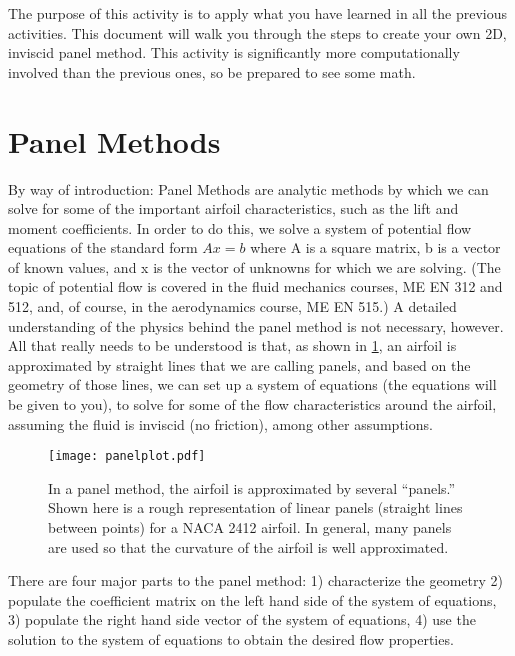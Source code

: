 \documentclass{article}%
\begin{document}
The purpose of this activity is to apply what you have learned in all the previous activities. This document will walk you through the steps to create your own 2D, inviscid panel method. This activity is significantly more computationally involved than the previous ones, so be prepared to see some math.

\section*{Panel Methods}

By way of introduction: Panel Methods are analytic methods by which we can solve for some of the important airfoil characteristics, such as the lift and moment coefficients. In order to do this, we solve a system of potential flow equations of the standard form \(Ax=b\) where A is a square matrix, b is a vector of known values, and x is the vector of unknowns for which we are solving. (The topic of potential flow is covered in the fluid mechanics courses, ME EN 312 and 512, and, of course, in the aerodynamics course, ME EN 515.) A detailed understanding of the physics behind the panel method is not necessary, however. All that really needs to be understood is that, as shown in \cref{fig:panelplot}, an airfoil is approximated by straight lines that we are calling panels, and based on the geometry of those lines, we can set up a system of equations (the equations will be given to you), to solve for some of the flow characteristics around the airfoil, assuming the fluid is inviscid (no friction), among other assumptions.

\begin{figure}[h!]
	\centering
	\texttt{[image: panelplot.pdf]}
	\caption{In a panel method, the airfoil is approximated by several ``panels.'' Shown here is a rough representation of linear panels (straight lines between points) for a NACA 2412 airfoil. In general, many panels are used so that the curvature of the airfoil is well approximated.}
	\label{fig:panelplot}
\end{figure}

There are four major parts to the panel method: 1) characterize the geometry 2) populate the coefficient matrix on the left hand side of the system of equations, 3) populate the right hand side vector of the system of equations, 4) use the solution to the system of equations to obtain the desired flow properties.
\end{document}
